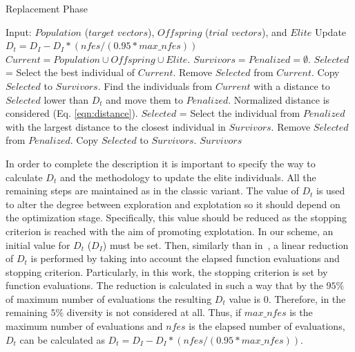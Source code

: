 \begin{algorithm}[t]
  \scriptsize
	\caption{Replacement Phase} \label{alg:Replacement}
	\begin{algorithmic}[1]
	\STATE Input: $Population$ ($target$ $vectors$), $Offspring$ ($trial$ $vectors$), and $Elite$
	\STATE Update $D_t = D_I - D_I *(nfes/(0.95*max\_nfes)) $ 
	\STATE $Current = Population \cup Offspring \cup Elite$.
	\STATE $Survivors = Penalized = \emptyset$.
	   \STATE $Selected$ = Select the best individual of $Current$.
		 \STATE Remove $Selected$ from $Current$.
	   \STATE Copy $Selected$ to $Survivors$.
	   \STATE Find the individuals from $Current$ with a distance to $Selected$ lower than $D_t$ and move them to $Penalized$. Normalized distance is considered (Eq. \ref{eqn:distance}).
	\ENDWHILE
	   \STATE $Selected$ = Select the individual from $Penalized$ with the largest distance to the closest individual in $Survivors$.
		 \STATE Remove $Selected$ from $Penalized$.
	   \STATE Copy $Selected$ to $Survivors$.
	\ENDWHILE
  \RETURN $Survivors$
\end{algorithmic}
\end{algorithm}


In order to complete the description it is important to specify the way to calculate $D_t$ and the methodology to update the 
elite individuals.
%
All the remaining steps are maintained as in the classic \DE{} variant.
%
The value of $D_t$ is used to alter the degree between exploration and explotation so it should depend on the optimization stage.
%
Specifically, this value should be reduced as the stopping criterion is reached with the aim of promoting explotation.
%
In our scheme, an initial value for $D_t$ ($D_I$) must be set.
%
Then, similarly than in~\cite{segura2016novel}, a linear reduction of $D_t$ is performed by taking into account the elapsed function evaluations and stopping criterion.
%
Particularly, in this work, the stopping criterion is set by function evaluations.
%
The reduction is calculated in such a way that by the $95\%$ of maximum number of evaluations the resulting $D_t$ value is $0$.
%
Therefore, in the remaining $5\%$ diversity is not considered at all.
%
Thus, if $max\_nfes$ is the maximum number of evaluations and $nfes$ is the elapsed number of evaluations, $D_t$ can be calculated as $D_t=D_I - D_I *(nfes/(0.95*max\_nfes))$.
%
%

